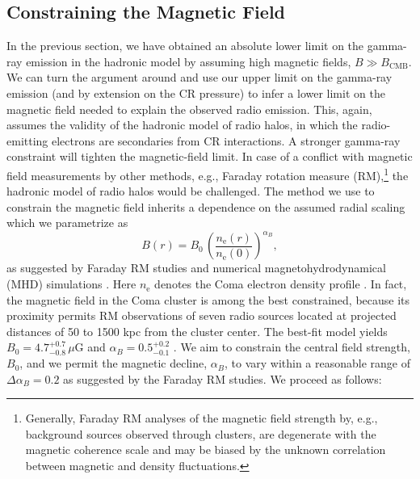 \documentclass[12pt,manuscript]{aastex}
\newcommand{\rmn}{\mathrm}
\begin{document}
\subsection{Constraining the Magnetic Field}
\label{sec:B}
In the previous section, we have obtained an absolute lower limit on the gamma-ray emission in
the hadronic model by assuming high magnetic fields, $B\gg B_\rmn{CMB}$. We can turn the
argument around and use our upper limit on the gamma-ray emission (and by extension on the
CR pressure) to infer a lower limit on the magnetic field needed to explain the observed radio
emission. This, again, assumes the validity of the hadronic model of radio halos, in which the
radio-emitting electrons are secondaries from CR interactions. A stronger gamma-ray
constraint will tighten the magnetic-field limit. In case of a conflict with magnetic field
measurements by other methods, e.g., Faraday rotation measure (RM),\footnote{Generally,
Faraday RM analyses of the magnetic field strength by, e.g., background sources observed through
clusters, are degenerate with the magnetic coherence scale and may be biased by the unknown
correlation between magnetic and density fluctuations.} the hadronic model of radio halos would
be challenged. The method we use to constrain the magnetic field inherits a dependence on
the assumed radial scaling which we parametrize as
\begin{equation}
\label{eq:B}
B(r) = B_{0} \,\left(\frac{n_{\rmn{e}}(r)}{n_{\rmn{e}}(0)}\right)^{\alpha_B},
\end{equation}
as suggested by Faraday RM studies and numerical magnetohydrodynamical (MHD) simulations
\citep[][and references therein]{article:Bonafede_etal:2010, article:Bonafede_etal:2011}. Here
$n_{\rmn{e}}$ denotes the Coma electron density profile \citep{article:BrielHenryBohringer:1992}.
In fact, the magnetic field in the Coma cluster is among the best constrained, because its proximity
permits RM observations of seven radio sources located at projected distances of 50 to 1500 kpc from
the cluster center. The best-fit model yields $B_{0} = 4.7^{+0.7}_{-0.8}\,\mu$G and $\alpha_{B} =
0.5^{+0.2}_{-0.1}$ \citep{article:Bonafede_etal:2010}. We aim to constrain the central field
strength, $B_{0}$, and we permit the magnetic decline, $\alpha_{B}$, to vary within a reasonable
range of $\Delta\alpha_{B}=0.2$ as suggested by the Faraday RM studies. We proceed as follows:
\end{document}
